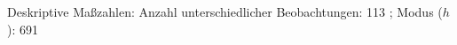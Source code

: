 				\label{tableValues:cjob043_g2}
				\vspace*{-\baselineskip}
                    \begin{noten}
                	    \note{} Deskriptive Maßzahlen:
                	    Anzahl unterschiedlicher Beobachtungen: 113%
                	    ; 
                	      Modus ($h$): 691
                     \end{noten}

